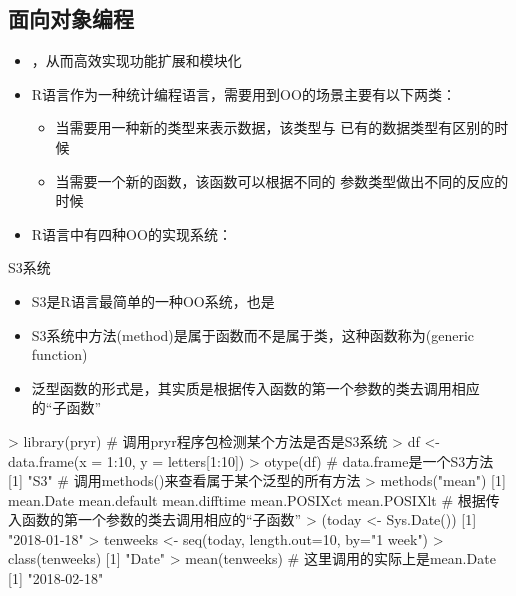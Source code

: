 \subsection{面向对象编程}
\begin{frame}[t]{\subsecname}{}
\begin{itemize}
\item {}，从而高效实现功能扩展和模块化
  \item R语言作为一种统计编程语言，需要用到OO的场景主要有以下两类：
  \begin{itemize}
     \item[\PencilLeftDown] 当需要用一种新的类型来表示数据，该类型与
   已有的数据类型有区别的时候
     \item[\PencilLeftDown] 当需要一个新的函数，该函数可以根据不同的
参数类型做出不同的反应的时候
  \end{itemize}
\item R语言中有四种OO的实现系统：
\end{itemize}  
\end{frame} 

\begin{frame}[t,fragile]{\subsecname}{S3系统}
  \begin{itemize}
  \item S3是R语言最简单的一种OO系统，也是
  \item S3系统中方法(method)是属于函数而不是属于类，这种函数称为(generic function)
  \item 泛型函数的形式是，其实质是根据传入函数的第一个参数的类去调用相应的“子函数”
  \end{itemize}  

\begin{rcode}
> library(pryr) # 调用pryr程序包检测某个方法是否是S3系统
> df <- data.frame(x = 1:10, y = letters[1:10])
> otype(df)    # data.frame是一个S3方法
[1] "S3"
# 调用methods()来查看属于某个泛型的所有方法
> methods("mean")
[1] mean.Date   mean.default    mean.difftime   mean.POSIXct    mean.POSIXlt
# 根据传入函数的第一个参数的类去调用相应的“子函数”
> (today <- Sys.Date())
[1] "2018-01-18"
> tenweeks <- seq(today, length.out=10, by="1 week")
> class(tenweeks)
[1] "Date"
> mean(tenweeks) # 这里调用的实际上是mean.Date
[1] "2018-02-18" 
\end{rcode}  
\end{frame}

